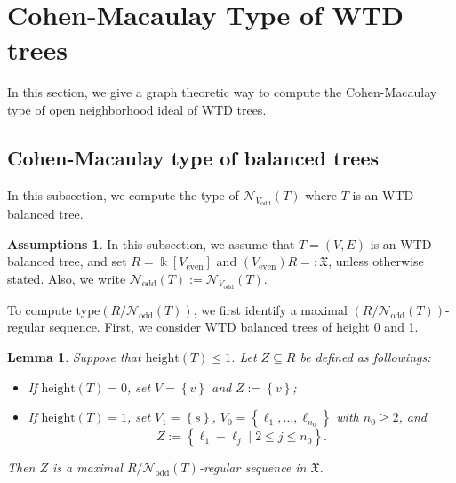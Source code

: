 \documentclass[12pt, reqno]{amsart}
\theoremstyle{definition}
\newtheorem*{assumptions}{Assumptions}
\theoremstyle{plain}
\newtheorem{lemma}[theorem]{Lemma}
\theoremstyle{definition}
\newcommand{\tp}{\mbox{type}}
\newcommand{\hh}{\mbox{height}}
\newcommand{\kk}{\Bbbk}
\newcommand\Set[2]{\left\lbrace #1 \mid #2 \right\rbrace}
\newcommand\set[1]{\left\lbrace #1 \right\rbrace}
\newcommand{\NN}{\mathcal{N}}
\begin{document}
\section{Cohen-Macaulay Type of WTD trees}
\label{sec241204d}

In this section, we give a graph theoretic way to compute the Cohen-Macaulay type of open neighborhood ideal of WTD trees.

\subsection{Cohen-Macaulay type of balanced trees}

In this subsection, we compute the type of $\NN_{V_{\text{odd}}}(T)$ where $T$ is an WTD balanced tree.

\begin{assumptions}
In this subsection, we assume that $T = (V,E)$ is an WTD balanced tree, and set $R = \kk[V_{\text{even}}]$ and $(V_{\text{even}})R =: \mathfrak{X}$, unless otherwise stated.
Also, we write $\NN_{\text{odd}}(T) := \NN_{V_{\text{odd}}}(T)$.
\end{assumptions}

To compute $\tp(R/\NN_{\text{odd}}(T))$, we first identify a maximal $(R/\NN_{\text{odd}}(T))$-regular sequence.
First, we consider WTD balanced trees of height 0 and 1.

\begin{lemma}\label{lemma. max. reg. seq. of hh(T) < 3}
    Suppose that $\hh(T) \leq 1$.
    Let $Z \subseteq R$ be defined as followings:
    \begin{itemize}
        \item[(1)] If $\hh(T) = 0$, set $V = \set{v}$ and $Z := \set{v}$;
        \item[(2)] If $\hh(T) = 1$, set $V_1 = \set{s}$, $V_0 = \set{\ell_1,\dots,\ell_{n_0}}$ with $n_0 \geq 2$, and
        $$
        Z := \Set{\ell_{1}-\ell_j}{2 \leq j \leq n_0}.
        $$
    \end{itemize}
    Then $Z$ is a maximal $R/\NN_{\text{odd}}(T)$-regular sequence in $\mathfrak{X}$. 
\end{lemma}
\end{document}
